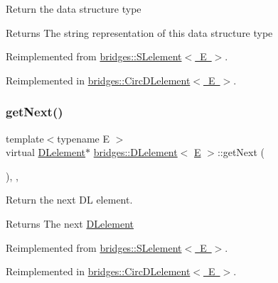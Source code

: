 Return the data structure type

\begin{DoxyReturn}{Returns}
The string representation of this data structure type 
\end{DoxyReturn}


Reimplemented from \mbox{\hyperlink{classbridges_1_1_s_lelement_a136330b3481a47b3edb429f323274655}{bridges\+::\+S\+Lelement$<$ E $>$}}.



Reimplemented in \mbox{\hyperlink{classbridges_1_1_circ_d_lelement_a0e199fe681755df694807261ce2460c2}{bridges\+::\+Circ\+D\+Lelement$<$ E $>$}}.

\mbox{\label{classbridges_1_1_d_lelement_a0c713707d8c7d0a97fe4194ed6592ede}} 
\subsubsection{\texorpdfstring{getNext()}{getNext()}\hspace{0.1cm}{\footnotesize\ttfamily [1/2]}}
{\footnotesize\ttfamily template$<$typename E $>$ \\
virtual \mbox{\hyperlink{classbridges_1_1_d_lelement}{D\+Lelement}}$\ast$ \mbox{\hyperlink{classbridges_1_1_d_lelement}{bridges\+::\+D\+Lelement}}$<$ \mbox{\hyperlink{namespacebridges_acfb0a4f7877d8f63de3e6862004c50eda3a3ea00cfc35332cedf6e5e9a32e94da}{E}} $>$\+::get\+Next (\begin{DoxyParamCaption}{ }\end{DoxyParamCaption})\hspace{0.3cm}{\ttfamily [inline]}, {\ttfamily [override]}, {\ttfamily [virtual]}}

Return the next DL element.

\begin{DoxyReturn}{Returns}
The next \mbox{\hyperlink{classbridges_1_1_d_lelement}{D\+Lelement}} 
\end{DoxyReturn}


Reimplemented from \mbox{\hyperlink{classbridges_1_1_s_lelement_a5bd74108a9aa49339378bf62cdbb19ca}{bridges\+::\+S\+Lelement$<$ E $>$}}.



Reimplemented in \mbox{\hyperlink{classbridges_1_1_circ_d_lelement_a52996d42efc5680d1f8b406143abfee5}{bridges\+::\+Circ\+D\+Lelement$<$ E $>$}}.

